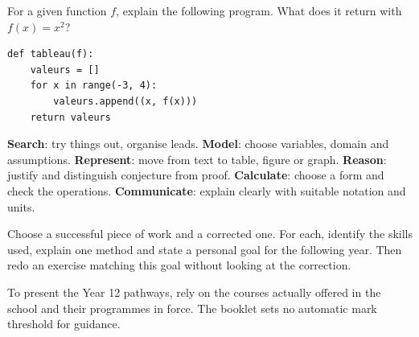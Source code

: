 \begin{example}For a given function $f$, explain the following program. What does it return with $f(x)=x^2$?\end{example}
\begin{lstlisting}
def tableau(f):
    valeurs = []
    for x in range(-3, 4):
        valeurs.append((x, f(x)))
    return valeurs
\end{lstlisting}
\begin{keypoint}
\textbf{Search}: try things out, organise leads. \textbf{Model}: choose variables, domain and assumptions. \textbf{Represent}: move from text to table, figure or graph. \textbf{Reason}: justify and distinguish conjecture from proof. \textbf{Calculate}: choose a form and check the operations. \textbf{Communicate}: explain clearly with suitable notation and units.
\end{keypoint}
\begin{example}Choose a successful piece of work and a corrected one. For each, identify the skills used, explain one method and state a personal goal for the following year. Then redo an exercise matching this goal without looking at the correction.\end{example}
\begin{teachernote}To present the Year 12 pathways, rely on the courses actually offered in the school and their programmes in force. The booklet sets no automatic mark threshold for guidance.\end{teachernote}
